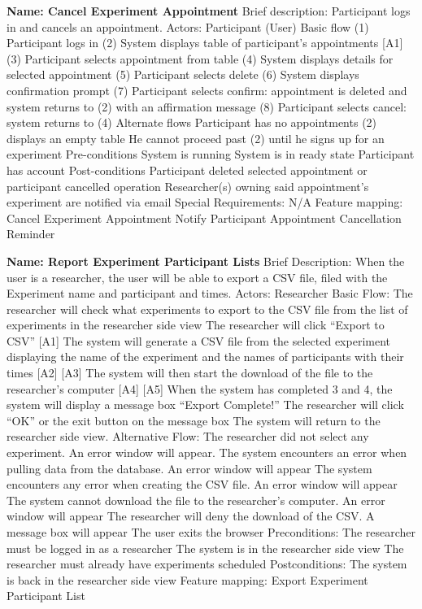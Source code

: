 \begin{outline}[enumerate]
\1 {\bf Name: Cancel Experiment Appointment}
\2 Brief description: Participant logs in and cancels an appointment.
\2 Actors: Participant (User)
\2 Basic flow
\3 (1) Participant logs in
\3 (2) System displays table of participant's appointments [A1]
\3 (3) Participant selects appointment from table
\3 (4) System displays details for selected appointment
\3 (5) Participant selects delete
\3 (6) System displays confirmation prompt
\3 (7) Participant selects confirm: appointment is deleted and system returns to (2) with an affirmation message
\3 (8) Participant selects cancel: system returns to (4)
\2 Alternate flows
\3 [A1] Participant has no appointments
\4 (2) displays an empty table
\4 He cannot proceed past (2) until he signs up for an experiment
\2 Pre-conditions
\3 System is running
\3 System is in ready state
\3 Participant has account
\2 Post-conditions
\3 Participant deleted selected appointment or participant cancelled operation
\3 Researcher(s) owning said appointment's experiment are notified via email
\2 Special Requirements:
\3 N/A
\2 Feature mapping:
\3 Cancel Experiment Appointment
\3 Notify Participant Appointment Cancellation Reminder

\1 {\bf Name: Report Experiment Participant Lists}
\2 Brief Description:  When the user is a researcher, the user will be able to export a CSV file, filed with the Experiment name and participant and times.
\2 Actors: Researcher
\2 Basic Flow:
\3 The researcher will check what experiments to export to the CSV file from the list of experiments in the researcher side view
\3 The researcher will click ``Export to CSV” [A1] 
\3 The system will generate a CSV file from the selected experiment displaying the name of the experiment and the names of participants with their times [A2] [A3]
\3 The system will then start the download of the file to the researcher's computer [A4] [A5]
\3 When the system has completed 3 and 4, the system will display a message box “Export Complete!”
\3 The researcher will click ``OK” or the exit button on the message box
\3 The system will return to the researcher side view.
\2 Alternative Flow:
\3 [A1] The researcher did not select any experiment.  An error window will appear.
\3 [A2] The system encounters an error when pulling data from the database. An error window will appear
\3 [A3] The system encounters any error when creating the CSV file. An error window will appear
\3 [A4] The system cannot download the file to the researcher's computer. An error window will appear
\3 [A5] The researcher will deny the download of the CSV.  A message box will appear
\3 [A6] The user exits the browser
\2 Preconditions:
\3 The researcher must be logged in as a researcher
\3 The system is in the researcher side view
\3 The researcher must already have experiments scheduled
\2 Postconditions:
\3 The system is back in the researcher side view
\2 Feature mapping:
\3 Export Experiment Participant List


\end{outline}
